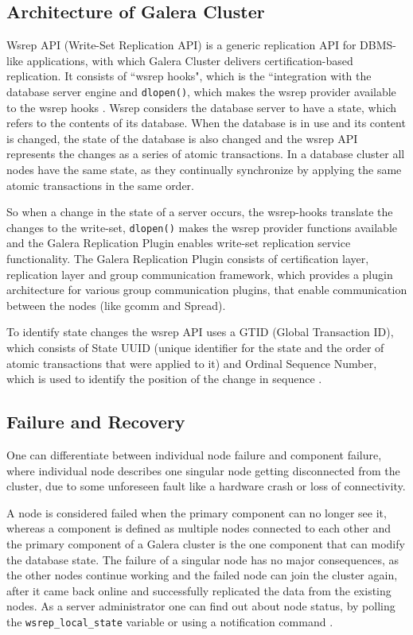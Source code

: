 \documentclass{sig-alternate}
\begin{document}
\subsection{Architecture of Galera Cluster}

Wsrep API (Write-Set Replication API) is a generic replication API for DBMS-like applications, with which Galera Cluster delivers certification-based replication. It consists of ``wsrep hooks", which is the ``integration with the database server engine and \texttt{dlopen()}, which makes the wsrep provider available to the wsrep hooks \cite{wsrepapi}. Wsrep considers the database server to have a state, which refers to the contents of its database. When the database is in use and its content is changed, the state of the database is also changed and the wsrep API represents the changes as a series of atomic transactions. In a database cluster all nodes have the same state, as they continually synchronize by applying the same atomic transactions in the same order.

So when a change in the state of a server occurs, the wsrep-hooks translate the changes to the write-set, \texttt{dlopen()} makes the wsrep provider functions available and the Galera Replication Plugin enables write-set replication service functionality. The Galera Replication Plugin consists of certification layer, replication layer and group communication framework, which provides a plugin architecture for various group communication plugins, that enable communication between the nodes (like gcomm and Spread).

To identify state changes the wsrep API uses a GTID (Global Transaction ID), which consists of State UUID (unique identifier for the state and the order of atomic transactions that were applied to it) and Ordinal Sequence Number, which is used to identify the position of the change in sequence \cite{wsrepapi}.

\subsection{Failure and Recovery}

One can differentiate between individual node failure and component failure, where individual node describes one singular node getting disconnected from the cluster, due to some unforeseen fault like a hardware crash or loss of connectivity.

A node is considered failed when the primary component can no longer see it, whereas a component is defined as multiple nodes connected to each other and the primary component of a Galera cluster is the one component that can modify the database state. The failure of a singular node has no major consequences, as the other nodes continue working and the failed node can join the cluster again, after it came back online and successfully replicated the data from the existing nodes. As a server administrator one can find out about node status, by polling the \texttt{wsrep\_local\_state} variable or using a notification command \cite{galerarecovery}.
\end{document}
